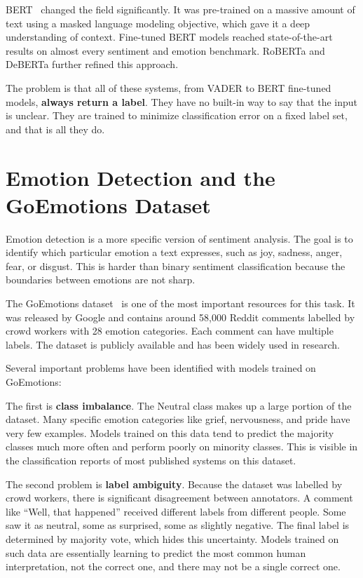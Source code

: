 BERT~\cite{bert} changed the field significantly. It was pre-trained on a massive amount of text using
a masked language modeling objective, which gave it a deep understanding of context.
Fine-tuned BERT models reached state-of-the-art results on almost every sentiment and emotion
benchmark. RoBERTa and DeBERTa further refined this approach.

The problem is that all of these systems, from VADER to BERT fine-tuned models, \textbf{always
return a label}. They have no built-in way to say that the input is unclear. They are trained
to minimize classification error on a fixed label set, and that is all they do.

\section{Emotion Detection and the GoEmotions Dataset}

Emotion detection is a more specific version of sentiment analysis. The goal is to identify
which particular emotion a text expresses, such as joy, sadness, anger, fear, or disgust. This
is harder than binary sentiment classification because the boundaries between emotions are not
sharp.

The GoEmotions dataset~\cite{goemotions} is one of the most important resources for this task. It was
released by Google and contains around 58,000 Reddit comments labelled by crowd workers
with 28 emotion categories. Each comment can have multiple labels. The dataset is publicly
available and has been widely used in research.

Several important problems have been identified with models trained on GoEmotions:

The first is \textbf{class imbalance}. The Neutral class makes up a large portion of the dataset.
Many specific emotion categories like grief, nervousness, and pride have very few examples.
Models trained on this data tend to predict the majority classes much more often and perform
poorly on minority classes. This is visible in the classification reports of most published systems
on this dataset.

The second problem is \textbf{label ambiguity}. Because the dataset was labelled by crowd
workers, there is significant disagreement between annotators. A comment like ``Well, that
happened'' received different labels from different people. Some saw it as neutral, some as
surprised, some as slightly negative. The final label is determined by majority vote, which hides
this uncertainty. Models trained on such data are essentially learning to predict the most common
human interpretation, not the correct one, and there may not be a single correct one.

